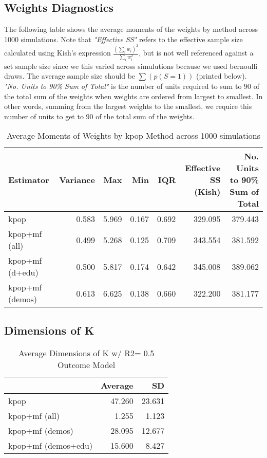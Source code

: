 \documentclass[
]{article}
\begin{document}
\hypertarget{weights-diagnostics}{%
\subsection{Weights Diagnostics}\label{weights-diagnostics}}

The following table shows the average moments of the weights by method
across 1000 simulations. Note that \textit{"Effective SS"} refers to the
effective sample size calculated using Kish's expression
\(\frac{\left(\sum_i w_i\right)^2}{\sum_i w_i^2}\), but is not well
referenced against a set sample size since we this varied across
simulutions because we used bernoulli draws. The average sample size
should be \(\sum(p(S=1))\) (printed below).
\textit{"No. Units to 90\% Sum of Total"} is the number of units
required to sum to \(90%
\) of the total sum of the weights when weights are ordered from largest
to smallest. In other words, summing from the largest weights to the
smallest, we require this number of units to get to \(90%
\) of the total sum of the weights.

\begin{table}[!h]

\caption{\label{tab:weights}Average Moments of Weights by kpop Method across 1000 simulations}
\centering
\begin{tabular}[t]{lrrrrrr}
\toprule
Estimator & Variance & Max & Min & IQR & \makecell[r]{Effective SS\\(Kish)} & \makecell[l]{No. Units to 90\%\\Sum of Total}\\
\midrule
kpop & 0.583 & 5.969 & 0.167 & 0.692 & 329.095 & 379.443\\
kpop+mf (all) & 0.499 & 5.268 & 0.125 & 0.709 & 343.554 & 381.592\\
kpop+mf (d+edu) & 0.500 & 5.817 & 0.174 & 0.642 & 345.008 & 389.062\\
kpop+mf (demos) & 0.613 & 6.625 & 0.138 & 0.660 & 322.200 & 381.177\\
\bottomrule
\end{tabular}
\end{table}

\hypertarget{dimensions-of-k}{%
\subsection{Dimensions of K}\label{dimensions-of-k}}

\begin{table}[!h]

\caption{\label{tab:unnamed-chunk-8}Average Dimensions of K w/ R2= 0.5 Outcome Model}
\centering
\begin{tabular}[t]{lrr}
\toprule
  & Average & SD\\
\midrule
kpop & 47.260 & 23.631\\
kpop+mf (all) & 1.255 & 1.123\\
kpop+mf (demos) & 28.095 & 12.677\\
kpop+mf (demos+edu) & 15.600 & 8.427\\
\bottomrule
\end{tabular}
\end{table}
\end{document}
